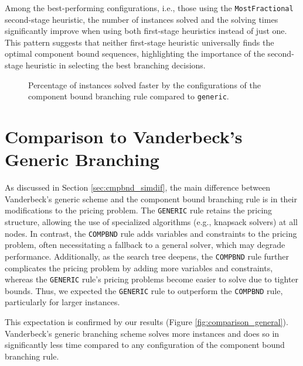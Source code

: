 Among the best-performing configurations, i.e., those using the \texttt{MostFractional} second-stage heuristic, the number of instances solved and the solving times significantly improve when using both first-stage heuristics instead of just one. This pattern suggests that neither first-stage heuristic universally finds the optimal component bound sequences, highlighting the importance of the second-stage heuristic in selecting the best branching decisions.

\begin{figure}
	\centering

	\begin{subfigure}{0.495\textwidth}
		\centering
		
	\end{subfigure}
	\hfill
	\begin{subfigure}{0.495\textwidth}
		\centering
		
	\end{subfigure}

	\caption{Percentage of instances solved faster by the configurations of the component bound branching rule compared to \texttt{generic}.}
	\label{fig:comparison_outperform}
\end{figure}

\section{Comparison to Vanderbeck's Generic Branching}\label{sec:evaluation_comparison_generic}
As discussed in Section \ref{sec:cmpbnd_simdif}, the main difference between Vanderbeck's generic scheme and the component bound branching rule is in their modifications to the pricing problem. The \texttt{GENERIC} rule retains the pricing structure, allowing the use of specialized algorithms (e.g., knapsack solvers) at all nodes. In contrast, the \texttt{COMPBND} rule adds variables and constraints to the pricing problem, often necessitating a fallback to a general \MIP{} solver, which may degrade performance. Additionally, as the search tree deepens, the \texttt{COMPBND} rule further complicates the pricing problem by adding more variables and constraints, whereas the \texttt{GENERIC} rule's pricing problems become easier to solve due to tighter bounds. Thus, we expected the \texttt{GENERIC} rule to outperform the \texttt{COMPBND} rule, particularly for larger instances.

This expectation is confirmed by our results (Figure \ref{fig:comparison_general}). Vanderbeck's generic branching scheme solves more instances and does so in significantly less time compared to any configuration of the component bound branching rule.


